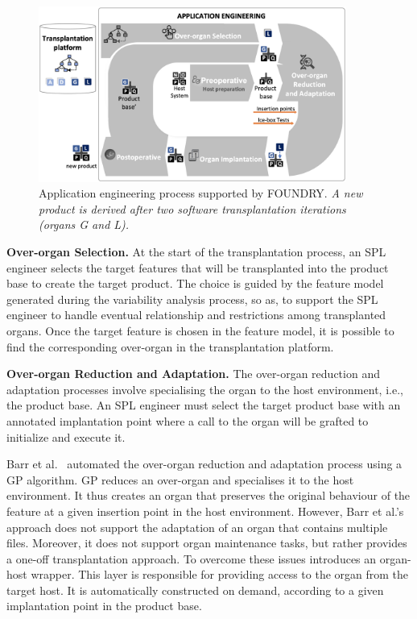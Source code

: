 \begin{figure}[t]
	\centering  \includegraphics[width=0.9\textwidth]{images/FOUNDRY_APP5.png}
	\centering \caption{Application engineering process supported by FOUNDRY. \textit{A new product is derived after two software transplantation iterations (organs G and L).}}
	\label{fig:foundry_app}
\end{figure} 

\textbf{Over-organ Selection.} At the start of the transplantation process, an SPL engineer selects the target features that will be transplanted into the product base to create the target product. 
The choice is guided by the feature model generated during the variability analysis process, so as, to support the SPL engineer to handle eventual relationship and restrictions among transplanted organs. Once the target feature is chosen in the feature model, it is possible to find the corresponding over-organ in the transplantation platform.

\textbf{Over-organ Reduction and Adaptation.} The over-organ reduction and adaptation processes involve specialising the organ to the host environment, i.e., the product base. An SPL engineer must select the target product base with an annotated implantation point where a call to the organ will be grafted to initialize and execute it. 

Barr et al.~\cite{Barr2015} automated the over-organ reduction and adaptation process using a GP algorithm.
GP reduces an over-organ and specialises it to the host environment.
It thus creates an organ that preserves the original behaviour of the feature at a given insertion point in the host environment. 
However, Barr et al.'s approach does not support the adaptation of an organ that contains multiple files. 
Moreover, it does not support organ maintenance tasks, but rather provides a one-off transplantation approach.
To overcome these issues \FOUNDRY introduces an organ-host wrapper.
This layer is responsible for providing access to the organ from the target host. 
It is automatically constructed on demand, according to a given implantation point in the product base. 


